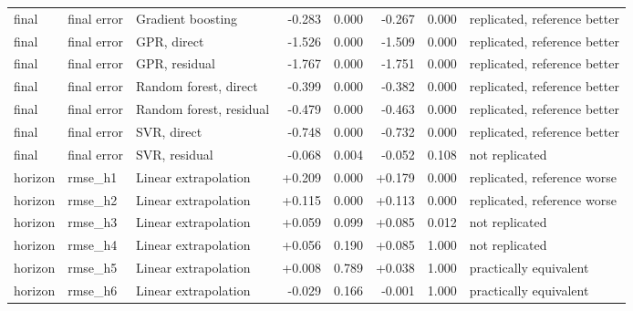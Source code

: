 \begin{table}[t]
\begin{tabular}{lllrrrrl}
    final & final error & Gradient boosting & -0.283 & 0.000 & -0.267 & 0.000 & replicated, reference better \\
    final & final error & GPR, direct & -1.526 & 0.000 & -1.509 & 0.000 & replicated, reference better \\
    final & final error & GPR, residual & -1.767 & 0.000 & -1.751 & 0.000 & replicated, reference better \\
    final & final error & Random forest, direct & -0.399 & 0.000 & -0.382 & 0.000 & replicated, reference better \\
    final & final error & Random forest, residual & -0.479 & 0.000 & -0.463 & 0.000 & replicated, reference better \\
    final & final error & SVR, direct & -0.748 & 0.000 & -0.732 & 0.000 & replicated, reference better \\
    final & final error & SVR, residual & -0.068 & 0.004 & -0.052 & 0.108 & not replicated \\
    horizon & rmse\_h1 & Linear extrapolation & +0.209 & 0.000 & +0.179 & 0.000 & replicated, reference worse \\
    horizon & rmse\_h2 & Linear extrapolation & +0.115 & 0.000 & +0.113 & 0.000 & replicated, reference worse \\
    horizon & rmse\_h3 & Linear extrapolation & +0.059 & 0.099 & +0.085 & 0.012 & not replicated \\
    horizon & rmse\_h4 & Linear extrapolation & +0.056 & 0.190 & +0.085 & 1.000 & not replicated \\
    horizon & rmse\_h5 & Linear extrapolation & +0.008 & 0.789 & +0.038 & 1.000 & practically equivalent \\
    horizon & rmse\_h6 & Linear extrapolation & -0.029 & 0.166 & -0.001 & 1.000 & practically equivalent \\
    \bottomrule
  \end{tabular}
\end{table}

